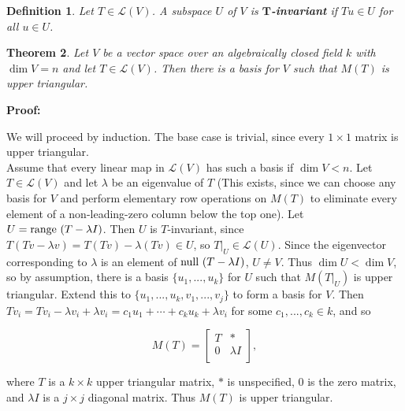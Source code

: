 \documentclass{article}
\theoremstyle{colontheorem}
\newtheorem{theorem}{Theorem}[section]
\newtheorem{definition}[theorem]{Definition}
\newcommand{\Null}{\textnormal{null }}
\newcommand{\Range}{\textnormal{range }}
\newenvironment{Theorem}
{
	\begin{mdframed}[backgroundcolor=TheoremOrange!10]
	\begin{theorem}
}
{
	\end{theorem}
	\end{mdframed}
	
	\vspace{.15in}
}
\newenvironment{Def}
{
	\begin{mdframed}[backgroundcolor=DefGreen!10]
	\begin{definition}
}
{
	\end{definition}
	\end{mdframed}
	
	\vspace{.15in}
}
\newenvironment{Proof}
{
	\vspace{-.3in}
	
	\begin{mdframed}[backgroundcolor=ProofPurple!10]
	\textbf{Proof:}%
}
{
	\end{mdframed}
	
	\vspace{.15in}
}
\begin{document}
\begin{Def}
	
	Let $T \in \mathcal{L}(V)$. A subspace $U$ of $V$ is \textbf{$\mathbf{T}$-invariant} if $Tu \in U$ for all $u \in U$.
	
\end{Def}



\begin{Theorem}
	
	Let $V$ be a vector space over an algebraically closed field $k$ with $\dim V = n$ and let $T \in \mathcal{L}(V)$. Then there is a basis for $V$ such that $M(T)$ is upper triangular.
	
\end{Theorem}



\begin{Proof}
	We will proceed by induction. The base case is trivial, since every $1 \times 1$ matrix is upper triangular.\\
	
	Assume that every linear map in $\mathcal{L}(V)$ has such a basis if $\dim V < n$. Let $T \in \mathcal{L}(V)$ and let $\lambda$ be an eigenvalue of $T$ (This exists, since we can choose any basis for $V$ and perform elementary row operations on $M(T)$ to eliminate every element of a non-leading-zero column below the top one). Let $U = \Range (T - \lambda I)$. Then $U$ is $T$-invariant, since $T(Tv - \lambda v) = T(Tv) - \lambda (Tv) \in U$, so $T|_U \in \mathcal{L}(U)$. Since the eigenvector corresponding to $\lambda$ is an element of $\Null (T - \lambda I)$, $U \neq V$. Thus $\dim U < \dim V$, so by assumption, there is a basis $\{u_1, ..., u_k\}$ for $U$ such that $M(T|_U)$ is upper triangular. Extend this to $\{u_1, ..., u_k, v_1, ..., v_j\}$ to form a basis for $V$. Then $Tv_i = Tv_i - \lambda v_i + \lambda v_i = c_1 u_1 + \cdots + c_k u_k + \lambda v_i$ for some $c_1, ..., c_k \in k$, and so
	
	$$
		M(T) = \begin{bmatrix}
			T & *\\
			0 & \lambda I\\
		\end{bmatrix},
	$$
	
	where $T$ is a $k \times k$ upper triangular matrix, $*$ is unspecified, $0$ is the zero matrix, and $\lambda I$ is a $j \times j$ diagonal matrix. Thus $M(T)$ is upper triangular.
	
\end{Proof}
\end{document}
